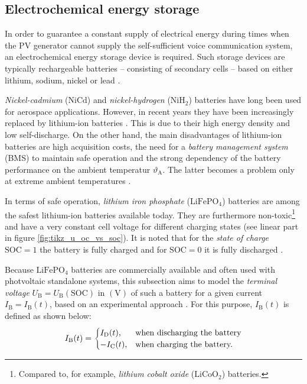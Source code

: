 \subsection{Electrochemical energy storage} \label{sec:electrochemical}
In order to guarantee a constant supply of electrical energy during times when the PV generator cannot supply the self-sufficient voice communication system, an electrochemical energy storage device is required. Such storage devices are typically rechargeable batteries -- consisting of secondary cells -- based on either lithium, sodium, nickel or lead \cite{Mertens:2015, Sterner:2017, Kurzweil:2018}. 

\emph{Nickel-cadmium} ($\mathrm{NiCd}$) and \emph{nickel-hydrogen} ($\mathrm{NiH}_2$) batteries have long been used for aerospace applications. However, in recent years they have been increasingly replaced by lithium-ion batteries \cite{Ley:2011}. This is due to their high energy density and low self-discharge. On the other hand, the main disadvantages of lithium-ion batteries are high acquisition costs, the need for a \emph{battery management system} (BMS) to maintain safe operation and the strong dependency of the battery performance on the ambient temperatur $\vartheta_{\mathrm{A}}$. The latter becomes a problem only at extreme ambient temperatures \cite{Hausmann:2013, Wehbe:2015, Ala-A.-Hussein:2015, Nejad:2016, Chin:2018}.

In terms of safe operation, \emph{lithium iron phosphate} ($\mathrm{LiFePO}_4$) batteries are among the safest lithium-ion batteries available today. They are furthermore non-toxic\footnote{Compared to, for example, \emph{lithium cobalt oxide} ($\mathrm{LiCoO}_2$) batteries.} and have a very constant cell voltage for different charging states (see linear part in figure \ref{fig:tikz_u_oc_vs_soc}). It is noted that for the \emph{state of charge} $\mathrm{SOC} = 1$ the battery is fully charged and for $\mathrm{SOC} = 0$ it is fully discharged  \cite{Mertens:2015, Sterner:2017, Li:2018, Kurzweil:2018, Hinz:2019, Hossain:2019, Offgridtec:2020}. 

Because $\mathrm{LiFePO}_4$ batteries are commercially available and often used with photvoltaic standalone systems, this subsection aims to model the \emph{terminal voltage} $U_\mathrm{B} = U_\mathrm{B}(\mathrm{SOC})$ in $\left( \mathrm{V} \right)$ of such a battery for a given current $I_\mathrm{B} = I_\mathrm{B}(t)$, based on an experimental approach \cite{Mertens:2015, Offgridtec:2020}. For this purpose, $I_\mathrm{B}(t)$ is defined as shown below:
	\begin{equation} \label{eq:battery_current}
		\centering
		I_\mathrm{B}(t) =
  		\begin{cases}
   			I_\mathrm{D}(t)\text{,} & \text{when discharging the battery} \\
    		- I_\mathrm{C}(t)\text{,} & \text{when charging the battery.}
  		\end{cases}
	\end{equation} 
	
